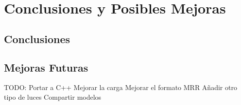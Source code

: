 
\chapter{Conclusiones y Posibles Mejoras} %

\label{Chapter5} %



\section{Conclusiones}

\section{Mejoras Futuras}
TODO: 
Portar a C++
Mejorar la carga
Mejorar el formato MRR
Añadir otro tipo de luces
Compartir modelos